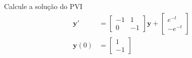 \begin{exeresol}
  Calcule a solução do PVI
  \begin{align}
    \pmb{y}' &=
    \begin{bmatrix}
      -1 & 1 \\
      0 & -1
    \end{bmatrix}\pmb{y} +
    \begin{bmatrix}
      e^{-t} \\
      -e^{-t}
    \end{bmatrix} \\
    \pmb{y}(0) &=
                 \begin{bmatrix}
                   1 \\
                   -1
                 \end{bmatrix}
  \end{align}
\end{exeresol}
